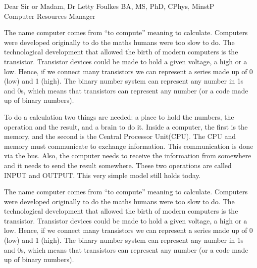 \documentclass[blank]{impletter}
\begin{document}
{
Dear Sir or Madam,
}
{
Dr Letty Foulkes
}
{
BA, MS, PhD, CPhys, MinstP\\
}
{
Computer Resources Manager\\
}
\informal

The name computer comes from ``to compute'' meaning to
calculate. Computers were developed originally to do the maths humans
were too slow to do. The technological development that allowed the
birth of modern computers is the transistor. Transistor devices could
be made to hold a given voltage, a high or a low. Hence, if we connect
many transistors we can represent a series made up of 0 (low) and 1
(high). The binary number system can represent any number in 1s and
0s, which means that transistors can represent any number (or a code
made up of binary numbers).

To do a calculation two things are needed: a place to hold the
numbers, the operation and the result, and a brain to do it. Inside a
computer, the first is the memory, and the second is the Central
Processor Unit(CPU). The CPU and memory must communicate to exchange
information. This communication is done via the bus. Also, the
computer needs to receive the information from somewhere and it needs
to send the result somewhere. These two operations are called INPUT
and OUTPUT. This very simple model still holds today.

The name computer comes from ``to compute'' meaning to
calculate. Computers were developed originally to do the maths humans
were too slow to do. The technological development that allowed the
birth of modern computers is the transistor. Transistor devices could
be made to hold a given voltage, a high or a low. Hence, if we connect
many transistors we can represent a series made up of 0 (low) and 1
(high). The binary number system can represent any number in 1s and
0s, which means that transistors can represent any number (or a code
made up of binary numbers).
\end{document}
